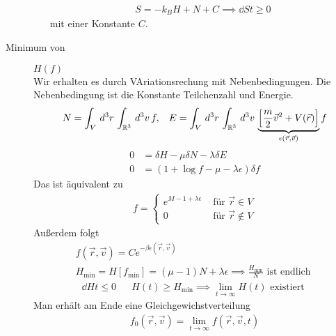 \begin{description}
\begin{itemize}
        \begin{align*}
          S = - k_B H + N + C \implies \dd{S}{t} \ge 0
        \end{align*}
        mit einer Konstante $C$.
    \end{itemize}
  \item[Minimum von ] $H(f)$ \\
    Wir erhalten es durch VAriationsrechung mit Nebenbedingungen. Die Nebenbedingung
    ist die Konstante Teilchenzahl und Energie.
    \begin{align*}
      N = \int_{V}^{} \,d^3 r\, \int_{\mathbb{R}^3}^{} \,d^3 v\, f, &&
      E = \int_{V}^{} \,d^3 r\, \int_{\mathbb{R}^3}^{} \,d^3 v\, \underbrace{\left[ \frac{m}{2}\vec{v}^2 + V(\vec{r}) \right]}_{\epsilon(\vec{r}, \vec{v})} f
    \end{align*}
    \begin{align*}
      0 & = \delta H - \mu \delta N - \lambda \delta E \\
      0 & = (1 + \log{f}  - \mu - \lambda \epsilon) \delta f
    \end{align*}
    Das ist äquivalent zu
    \begin{align*}
      f = \begin{cases}
        e^{ M - 1 + \lambda \epsilon} & \text{ für } \vec{r} \in V  \\
        0                             & \text{ für } \vec{r} \not\in V
      \end{cases} 
    \end{align*}
    Außerdem folgt
    \begin{align*}
      f(\vec{r}, \vec{v}) = C e^{-\beta \epsilon(\vec{r}, \vec{v})} \\
      H_\text{min} = H[f_\text{min}] = (\mu - 1)N + \lambda \epsilon \implies
      \frac{H_\text{min}}{N} \text{ ist endlich }
    \end{align*}
    \begin{align*}
      \dd{H}{t} \le 0 && H(t) \ge H_\text{min} \implies \lim_{t\to \infty}
      H(t) \text{ existiert }
    \end{align*}
    Man erhält am Ende eine Gleichgewichstverteilung
    \begin{align*}
      f_0(\vec{r}, \vec{v}) = \lim_{t\to \infty} f(\vec{r}, \vec{v}, t)
    \end{align*}
  
\end{description}

